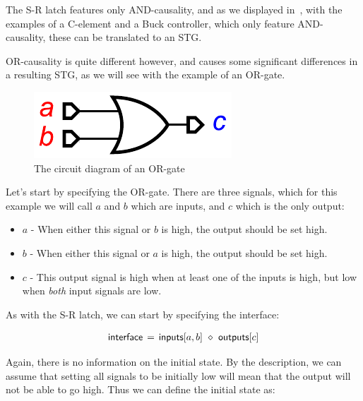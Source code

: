\documentclass[british, journal]{IEEEtran}
\begin{document}
The S-R latch features only AND-causality, and as we displayed 
in~\cite{2015_Beaumont_MEMOCODE}, with the examples of a C-element 
and a Buck controller, which only feature AND-causality, these can be translated
to an STG. 

OR-causality is quite different however, and causes some significant differences 
in a resulting STG, as we will see with the example of an OR-gate. 

\begin{figure}[h]
\begin{centering}
\includegraphics[scale=0.55]{Images/or-gate-circuit}
\par\end{centering}

\protect\caption{\label{fig:or-gate-circuit} The circuit diagram of an OR-gate}
\vspace{-3mm}
\end{figure}

Let's start by specifying the OR-gate. There are three signals, which for this 
example we will call $a$ and $b$ which are inputs, and $c$ which is the only output:

\begin{itemize}
  \item $a$ - When either this signal or $b$ is high, the output should be set high.
  \item $b$ - When either this signal or $a$ is high, the output should be set high.
  \item $c$ - This output signal is high when at least one of the inputs is high, but low when
		\emph{both} input signals are low.
\end{itemize}

As with the S-R latch, we can start by specifying the interface: 

\[
\begin{array}{lcl}
\mathsf{interface}&\hspace{-2mm}=&\hspace{-2mm}\mathsf{inputs}[a, b]~\diamond~\mathsf{outputs}[c]
\end{array}
\]

Again, there is no information on the initial state. By the description, we can
assume that setting all signals to be initially low will mean that the output
will not be able to go high. Thus we can define the initial state as:
\end{document}
